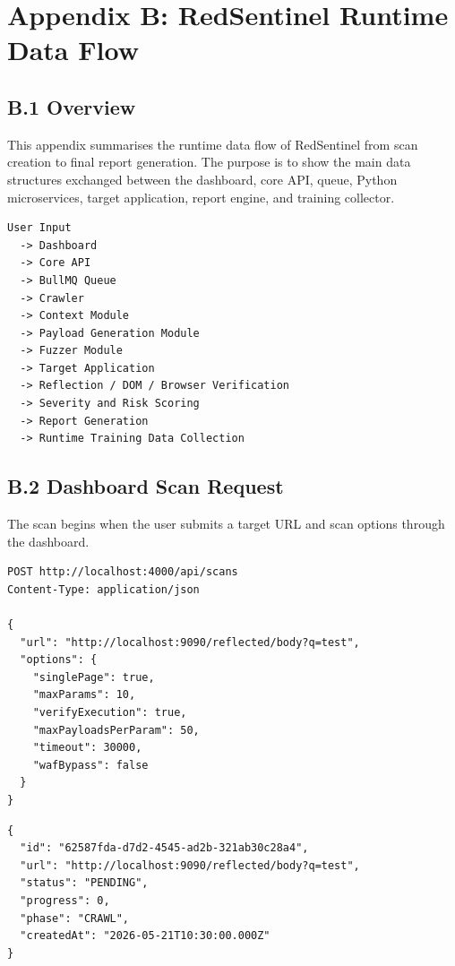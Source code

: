 \chapter*{Appendix B: RedSentinel Runtime Data Flow}

\begingroup
\small

\section*{B.1 Overview}

This appendix summarises the runtime data flow of RedSentinel from scan creation to final report generation. The purpose is to show the main data structures exchanged between the dashboard, core API, queue, Python microservices, target application, report engine, and training collector.

\begin{lstlisting}[style=appendixcode,caption={Overall scan pipeline}]
User Input
  -> Dashboard
  -> Core API
  -> BullMQ Queue
  -> Crawler
  -> Context Module
  -> Payload Generation Module
  -> Fuzzer Module
  -> Target Application
  -> Reflection / DOM / Browser Verification
  -> Severity and Risk Scoring
  -> Report Generation
  -> Runtime Training Data Collection
\end{lstlisting}

\section*{B.2 Dashboard Scan Request}

The scan begins when the user submits a target URL and scan options through the dashboard.

\begin{lstlisting}[style=appendixcode,caption={Dashboard to Core API request}]
POST http://localhost:4000/api/scans
Content-Type: application/json

{
  "url": "http://localhost:9090/reflected/body?q=test",
  "options": {
    "singlePage": true,
    "maxParams": 10,
    "verifyExecution": true,
    "maxPayloadsPerParam": 50,
    "timeout": 30000,
    "wafBypass": false
  }
}
\end{lstlisting}

\begin{lstlisting}[style=appendixcode,caption={Core API scan creation response}]
{
  "id": "62587fda-d7d2-4545-ad2b-321ab30c28a4",
  "url": "http://localhost:9090/reflected/body?q=test",
  "status": "PENDING",
  "progress": 0,
  "phase": "CRAWL",
  "createdAt": "2026-05-21T10:30:00.000Z"
}
\end{lstlisting}

